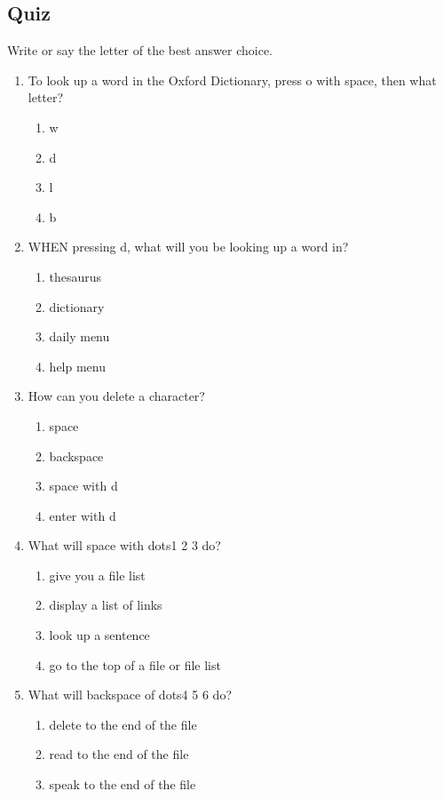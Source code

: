 \documentclass[10pt,letterpaper,twoside]{report}
\begin{document}
{{{\subsection{Quiz}
Write or say the letter of the best answer choice.
\begin{enumerate}
	\item To look up a word in the Oxford Dictionary, press o with space, then what letter?
	      \begin{enumerate} 
		      \item w
		      \item d
		      \item l
		      \item b
	      \end{enumerate}
	\item WHEN pressing d, what will you be looking up a word in?
	      \begin{enumerate}
		      \item thesaurus
		      \item dictionary
		      \item daily menu
		      \item help menu
	      \end{enumerate}
	\item How can you delete a character?
	      \begin{enumerate}
		      \item space
		      \item backspace
		      \item space with d
		      \item enter with d
	      \end{enumerate}
	\item What will space with dots1 2 3 do?
	      \begin{enumerate}
		      \item give you a file list
		      \item display a list of links
		      \item look up a sentence
		      \item go to the top of a file or file list
	      \end{enumerate}
	\item What will backspace of dots4 5 6 do?
	      \begin{enumerate}
		      \item delete to the end of the file
		      \item read to the end of the file
		      \item speak to the end of the file

\end{enumerate}
\end{enumerate}}}}
\end{document}
